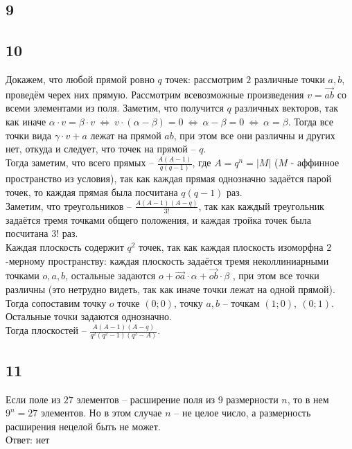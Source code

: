 		\subsection{9}
		
		\subsection{10}
		Докажем, что любой прямой ровно $q$ точек: рассмотрим $2$ различные точки $a,b$, проведём черех них прямую. Рассмотрим всевозможные произведения $v = \overrightarrow{ab}$ со всеми элементами из поля. Заметим, что получится $q$ различных векторов, так как иначе $\alpha \cdot v = \beta \cdot v \ \Leftrightarrow \ v \cdot (\alpha - \beta) = 0 \ \Leftrightarrow \ \alpha - \beta = 0 \ \Leftrightarrow \ \alpha = \beta$. Тогда все точки вида $\gamma \cdot v + a$ лежат на прямой $ab$, при этом все они различны и других нет, откуда и следует, что точек на прямой -- $q$. \\
		Тогда заметим, что всего прямых -- $\frac{A(A-1)}{q(q-1)}$, где $A = q^n = |M|$ ($M$ - аффинное пространство из условия), так как каждая прямая однозначно задаётся парой точек, то каждая прямая была посчитана $q(q-1)$ раз.\\
		Заметим, что треугольников -- $\frac{A(A-1)(A-q)}{3!}$, так как каждый треугольник задаётся тремя точками общего положения, и каждая тройка точек была посчитана $3!$ раз.\\
		Каждая плоскость содержит $q^2$ точек, так как каждая плоскость изоморфна $2$-мерному пространству: каждая плоскость задаётся тремя неколлиниарными точками $o,a,b$, остальные задаются $o + \overrightarrow{oa} \cdot \alpha + \overrightarrow{ob} \cdot \beta$ , при этом все точки различны (это нетрудно видеть, так как иначе точки лежат на одной прямой). Тогда сопоставим точку $o$ точке $(0;0)$, точку $a,b$ -- точкам $(1;0),\ (0;1)$. Остальные точки задаются однозначно.\\
		Тогда плоскостей -- $\frac{A(A-1)(A-q)}{q^2 (q^2 - 1) (q^2 - A)}$.
		
		\subsection{11}
		Если поле из $27$ элементов -- расширение поля из $9$ размерности $n$, то в нем $9^n = 27$ элементов. Но в этом случае $n$ -- не целое число, а размерность расширения нецелой быть не может.\\
		Ответ: нет\\
		
